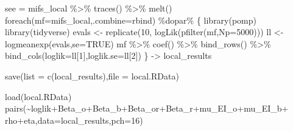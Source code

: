 \documentclass[
]{article}
\newenvironment{Shaded}{\begin{snugshade}}{\end{snugshade}}
\newcommand{\AttributeTok}[1]{\textcolor[rgb]{0.77,0.63,0.00}{#1}}
\newcommand{\ConstantTok}[1]{\textcolor[rgb]{0.00,0.00,0.00}{#1}}
\newcommand{\DecValTok}[1]{\textcolor[rgb]{0.00,0.00,0.81}{#1}}
\newcommand{\FunctionTok}[1]{\textcolor[rgb]{0.00,0.00,0.00}{#1}}
\newcommand{\NormalTok}[1]{#1}
\newcommand{\OtherTok}[1]{\textcolor[rgb]{0.56,0.35,0.01}{#1}}
\newcommand{\SpecialCharTok}[1]{\textcolor[rgb]{0.00,0.00,0.00}{#1}}
\newcommand{\StringTok}[1]{\textcolor[rgb]{0.31,0.60,0.02}{#1}}
\begin{document}
\begin{Shaded}
\begin{Highlighting}[]
\NormalTok{see }\OtherTok{=}\NormalTok{ mifs\_local }\SpecialCharTok{\%\textgreater{}\%}
  \FunctionTok{traces}\NormalTok{() }\SpecialCharTok{\%\textgreater{}\%}
  \FunctionTok{melt}\NormalTok{()}
\FunctionTok{foreach}\NormalTok{(}\AttributeTok{mf=}\NormalTok{mifs\_local,}\AttributeTok{.combine=}\NormalTok{rbind) }\SpecialCharTok{\%dopar\%}\NormalTok{ \{}
  \FunctionTok{library}\NormalTok{(pomp)}
  \FunctionTok{library}\NormalTok{(tidyverse)}
\NormalTok{  evals }\OtherTok{\textless{}{-}} \FunctionTok{replicate}\NormalTok{(}\DecValTok{10}\NormalTok{, }\FunctionTok{logLik}\NormalTok{(}\FunctionTok{pfilter}\NormalTok{(mf,}\AttributeTok{Np=}\DecValTok{5000}\NormalTok{)))}
\NormalTok{  ll }\OtherTok{\textless{}{-}} \FunctionTok{logmeanexp}\NormalTok{(evals,}\AttributeTok{se=}\ConstantTok{TRUE}\NormalTok{)}
\NormalTok{  mf }\SpecialCharTok{\%\textgreater{}\%} \FunctionTok{coef}\NormalTok{() }\SpecialCharTok{\%\textgreater{}\%} \FunctionTok{bind\_rows}\NormalTok{() }\SpecialCharTok{\%\textgreater{}\%}
    \FunctionTok{bind\_cols}\NormalTok{(}\AttributeTok{loglik=}\NormalTok{ll[}\DecValTok{1}\NormalTok{],}\AttributeTok{loglik.se=}\NormalTok{ll[}\DecValTok{2}\NormalTok{])}
\NormalTok{\} }\OtherTok{{-}\textgreater{}}\NormalTok{ local\_results}


\FunctionTok{save}\NormalTok{(}\AttributeTok{list =} \FunctionTok{c}\NormalTok{(}\StringTok{\textquotesingle{}local\_results\textquotesingle{}}\NormalTok{),}\AttributeTok{file =} \StringTok{\textquotesingle{}local.RData\textquotesingle{}}\NormalTok{)}
\end{Highlighting}
\end{Shaded}

\begin{Shaded}
\begin{Highlighting}[]
\FunctionTok{load}\NormalTok{(}\StringTok{\textquotesingle{}local.RData\textquotesingle{}}\NormalTok{)}
\FunctionTok{pairs}\NormalTok{(}\SpecialCharTok{\textasciitilde{}}\NormalTok{loglik}\SpecialCharTok{+}\NormalTok{Beta\_o}\SpecialCharTok{+}\NormalTok{Beta\_b}\SpecialCharTok{+}\NormalTok{Beta\_or}\SpecialCharTok{+}\NormalTok{Beta\_r}\SpecialCharTok{+}\NormalTok{mu\_EI\_o}\SpecialCharTok{+}\NormalTok{mu\_EI\_b}\SpecialCharTok{+}
\NormalTok{      rho}\SpecialCharTok{+}\NormalTok{eta,}\AttributeTok{data=}\NormalTok{local\_results,}\AttributeTok{pch=}\DecValTok{16}\NormalTok{)}
\end{Highlighting}
\end{Shaded}
\end{document}
